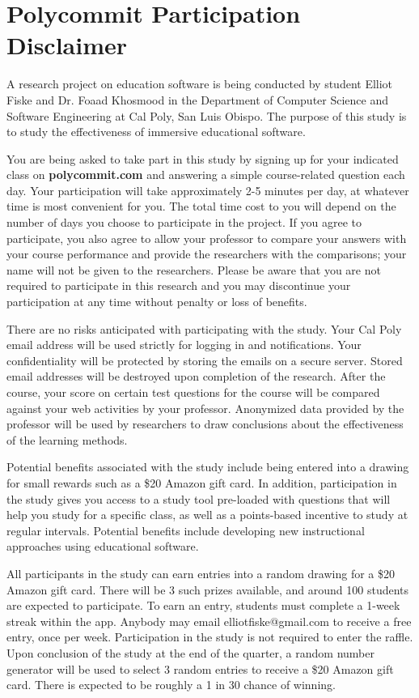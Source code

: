 
\chapter{Polycommit Participation Disclaimer}
\label{appendix:disclaimer}

A research project on education software is being conducted by student Elliot Fiske and Dr. Foaad Khosmood in the Department of Computer Science and Software Engineering at Cal Poly, San Luis Obispo. The purpose of this study is to study the effectiveness of immersive educational software.

You are being asked to take part in this study by signing up for your indicated class on \textbf{polycommit.com} and answering a simple course-related question each day.  Your participation will take approximately 2-5 minutes per day, at whatever time is most convenient for you. The total time cost to you will depend on the number of days you choose to participate in the project. If you agree to participate, you also agree to allow your professor to compare your answers with your course performance and provide the researchers with the comparisons; your name will not be given to the researchers.  Please be aware that you are not required to participate in this research and you may discontinue your participation at any time without penalty or loss of benefits.

There are no risks anticipated with participating with the study. Your Cal Poly email address will be used strictly for logging in and notifications. Your confidentiality will be protected by storing the emails on a secure server. Stored email addresses will be destroyed upon completion of the research. After the course, your score on certain test questions for the course will be compared against your web activities by your professor. Anonymized data provided by the professor will be used by researchers to draw conclusions about the effectiveness of the learning methods.

Potential benefits associated with the study include being entered into a drawing for small rewards such as a \$20 Amazon gift card. In addition, participation in the study gives you access to a study tool pre-loaded with questions that will help you study for a specific class, as well as a points-based incentive to study at regular intervals. Potential benefits include developing new instructional approaches using educational software.

All participants in the study can earn entries into a random drawing for a \$20 Amazon gift card. There will be 3 such prizes available, and around 100 students are expected to participate. To earn an entry, students must complete a 1-week streak within the app. Anybody may email elliotfiske@gmail.com to receive a free entry, once per week. Participation in the study is not required to enter the raffle. Upon conclusion of the study at the end of the quarter, a random number generator will be used to select 3 random entries to receive a \$20 Amazon gift card. There is expected to be roughly a 1 in 30 chance of winning.

